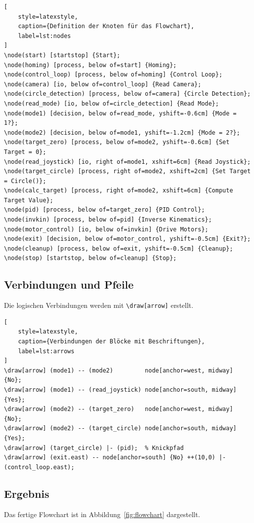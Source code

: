 \documentclass{article}
\begin{document}
\begin{lstlisting}[
    style=latexstyle,
    caption={Definition der Knoten für das Flowchart},
    label=lst:nodes
]
\node(start) [startstop] {Start};
\node(homing) [process, below of=start] {Homing};
\node(control_loop) [process, below of=homing] {Control Loop};
\node(camera) [io, below of=control_loop] {Read Camera};
\node(circle_detection) [process, below of=camera] {Circle Detection};
\node(read_mode) [io, below of=circle_detection] {Read Mode};
\node(mode1) [decision, below of=read_mode, yshift=-0.6cm] {Mode = 1?};
\node(mode2) [decision, below of=mode1, yshift=-1.2cm] {Mode = 2?};
\node(target_zero) [process, below of=mode2, yshift=-0.6cm] {Set Target = 0};
\node(read_joystick) [io, right of=mode1, xshift=6cm] {Read Joystick};
\node(target_circle) [process, right of=mode2, xshift=2cm] {Set Target = Circle()};
\node(calc_target) [process, right of=mode2, xshift=6cm] {Compute Target Value};
\node(pid) [process, below of=target_zero] {PID Control};
\node(invkin) [process, below of=pid] {Inverse Kinematics};
\node(motor_control) [io, below of=invkin] {Drive Motors};
\node(exit) [decision, below of=motor_control, yshift=-0.5cm] {Exit?};
\node(cleanup) [process, below of=exit, yshift=-0.5cm] {Cleanup};
\node(stop) [startstop, below of=cleanup] {Stop};
\end{lstlisting}

\subsection{Verbindungen und Pfeile}
Die logischen Verbindungen werden mit \texttt{\textbackslash draw[arrow]} erstellt.

\begin{lstlisting}[
    style=latexstyle,
    caption={Verbindungen der Blöcke mit Beschriftungen},
    label=lst:arrows
]
\draw[arrow] (mode1) -- (mode2)         node[anchor=west, midway] {No};
\draw[arrow] (mode1) -- (read_joystick) node[anchor=south, midway] {Yes};
\draw[arrow] (mode2) -- (target_zero)   node[anchor=west, midway] {No};
\draw[arrow] (mode2) -- (target_circle) node[anchor=south, midway] {Yes};
\draw[arrow] (target_circle) |- (pid);  % Knickpfad
\draw[arrow] (exit.east) -- node[anchor=south] {No} ++(10,0) |- (control_loop.east);
\end{lstlisting}

\subsection{Ergebnis}
Das fertige Flowchart ist in Abbildung~\ref{fig:flowchart} dargestellt.
\end{document}
